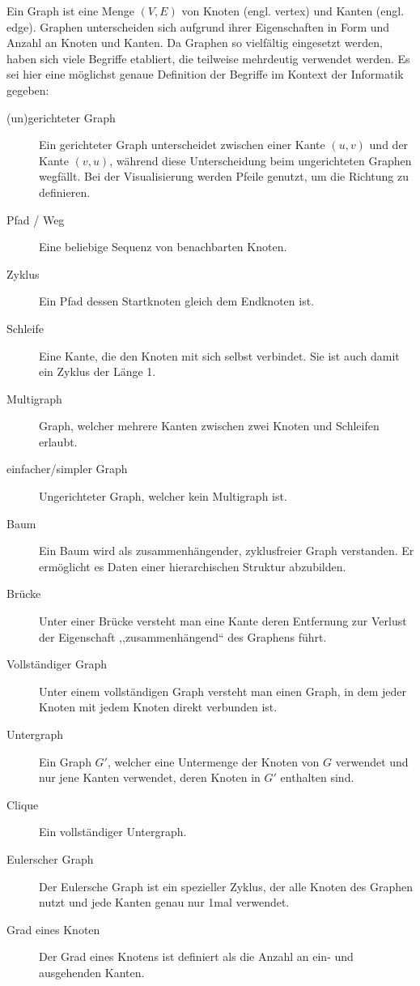 Ein Graph ist eine Menge $(V, E)$ von Knoten (engl. vertex) und Kanten (engl. edge). Graphen unterscheiden sich aufgrund ihrer Eigenschaften in Form und Anzahl an Knoten und Kanten. Da Graphen so vielfältig eingesetzt werden, haben sich viele Begriffe etabliert, die teilweise mehrdeutig verwendet werden. Es sei hier eine möglichst genaue Definition der Begriffe im Kontext der Informatik gegeben:
%
\begin{description}
  \item[(un)gerichteter Graph]
    Ein gerichteter Graph unterscheidet zwischen einer Kante $(u, v)$ und der Kante $(v, u)$, während diese Unterscheidung beim ungerichteten Graphen wegfällt. Bei der Visualisierung werden Pfeile genutzt, um die
    Richtung zu definieren.
  \item[Pfad / Weg] Eine beliebige Sequenz von benachbarten Knoten.
  \item[Zyklus]
   Ein Pfad dessen Startknoten gleich dem Endknoten ist.
  \item[Schleife]
   Eine Kante, die den Knoten mit sich selbst verbindet. Sie ist auch damit ein Zyklus der Länge 1.
  \item[Multigraph]
    Graph, welcher mehrere Kanten zwischen zwei Knoten und Schleifen erlaubt.
  \item[einfacher/simpler Graph]
    Ungerichteter Graph, welcher kein Multigraph ist.
  \item[Baum]
   Ein Baum wird als zusammenhängender, zyklusfreier Graph verstanden. Er ermöglicht es Daten einer hierarchischen Struktur abzubilden.
  \item[Brücke]
   Unter einer Brücke versteht man eine Kante deren Entfernung zur Verlust der Eigenschaft ,,zusammenhängend`` des Graphens führt.
  \item[Vollständiger Graph]
   Unter einem vollständigen Graph versteht man einen Graph, in dem jeder Knoten mit jedem Knoten direkt verbunden ist.
  \item[Untergraph]
   Ein Graph $G'$, welcher eine Untermenge der Knoten von $G$ verwendet und nur jene Kanten verwendet, deren Knoten in $G'$ enthalten sind.
  \item[Clique]
   Ein vollständiger Untergraph.
  \item[Eulerscher Graph]
   Der Eulersche Graph ist ein spezieller Zyklus, der alle Knoten des Graphen nutzt und jede Kanten genau nur 1mal verwendet.
  \item[Grad eines Knoten]
   Der Grad eines Knotens ist definiert als die Anzahl an ein- und ausgehenden Kanten.

\end{description}
